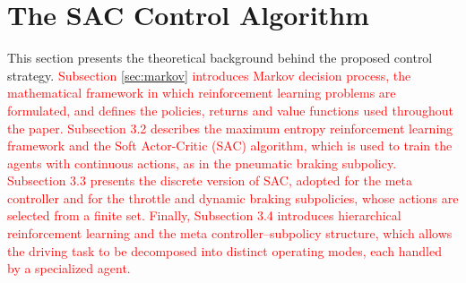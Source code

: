 \documentclass[preprint,10pt]{elsarticle}
\begin{document}

\section{The SAC Control Algorithm}\label{sec:RL}

This section presents the theoretical background behind the proposed control strategy. \textcolor{red}{Subsection \ref{sec:markov} introduces Markov decision process, the mathematical framework in which reinforcement learning problems are formulated, and defines the policies, returns and value functions used throughout the paper. Subsection 3.2 describes the maximum entropy reinforcement learning framework and the Soft Actor-Critic (SAC) algorithm, which is used to train the agents with continuous actions, as in the pneumatic braking subpolicy. Subsection 3.3 presents the discrete version of SAC, adopted for the meta controller and for the throttle and dynamic braking subpolicies, whose actions are selected from a finite set. Finally, Subsection 3.4 introduces hierarchical reinforcement learning and the meta controller–subpolicy structure, which allows the driving task to be decomposed into distinct operating modes, each handled by a specialized agent.}
\end{document}
